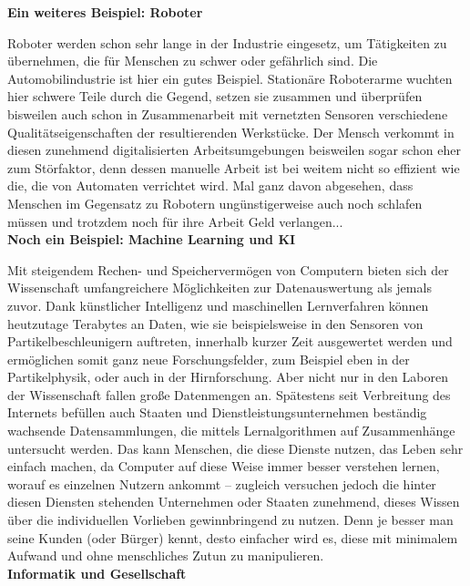 {    

    \textbf{Ein weiteres Beispiel: Roboter}

    Roboter werden schon sehr lange in der Industrie eingesetz, um Tätigkeiten zu übernehmen, die für Menschen zu schwer oder gefährlich sind. Die Automobilindustrie ist hier ein gutes Beispiel. Stationäre Roboterarme wuchten hier schwere Teile durch die Gegend, setzen sie zusammen und überprüfen bisweilen auch schon in Zusammenarbeit mit vernetzten Sensoren verschiedene Qualitätseigenschaften der resultierenden Werkstücke. Der Mensch verkommt in diesen zunehmend digitalisierten Arbeitsumgebungen beisweilen sogar schon eher zum Störfaktor, denn dessen manuelle Arbeit ist bei weitem nicht so effizient wie die, die von Automaten verrichtet wird. Mal ganz davon abgesehen, dass Menschen im Gegensatz zu Robotern ungünstigerweise auch noch schlafen müssen und trotzdem noch für ihre Arbeit Geld verlangen...\\

    \textbf{Noch ein Beispiel: Machine Learning und KI}

    Mit steigendem Rechen- und Speichervermögen von Computern bieten sich der Wissenschaft umfangreichere Möglichkeiten zur Datenauswertung als jemals zuvor. Dank künstlicher Intelligenz und maschinellen Lernverfahren können heutzutage Terabytes an Daten, wie sie beispielsweise in den Sensoren von Partikelbeschleunigern auftreten, innerhalb kurzer Zeit ausgewertet werden und ermöglichen somit ganz neue Forschungsfelder, zum Beispiel eben in der Partikelphysik, oder auch in der Hirnforschung. Aber nicht nur in den Laboren der Wissenschaft fallen große Datenmengen an. Spätestens seit Verbreitung des Internets befüllen auch Staaten und Dienstleistungsunternehmen beständig wachsende Datensammlungen, die mittels Lernalgorithmen auf Zusammenhänge untersucht werden. Das kann Menschen, die diese Dienste nutzen, das Leben sehr einfach machen, da Computer auf diese Weise immer besser verstehen lernen, worauf es einzelnen Nutzern ankommt -- zugleich versuchen jedoch die hinter diesen Diensten stehenden Unternehmen oder Staaten zunehmend, dieses Wissen über die individuellen Vorlieben gewinnbringend zu nutzen. Denn je besser man seine Kunden (oder Bürger) kennt, desto einfacher wird es, diese mit minimalem Aufwand und ohne menschliches Zutun zu manipulieren.\\

    \textbf{Informatik und Gesellschaft}

}
